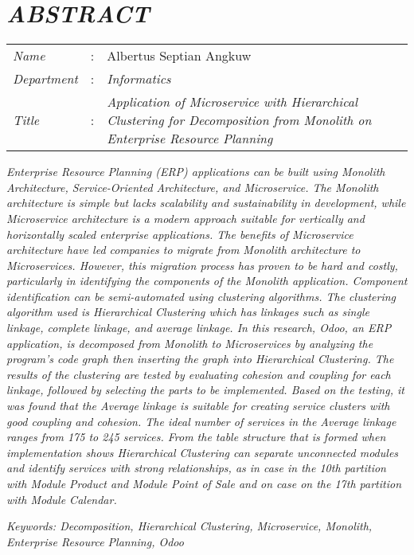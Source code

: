 \chapter*{\textit{ABSTRACT}}

\begin{longtable}{@{}p{2.5cm} l p{10.3cm}}
	\textit{Name} 			& : & Albertus Septian Angkuw \\
	\textit{Department}		& : & \textit{Informatics} \\
	\textit{Title}			& : & \textit{Application of Microservice with Hierarchical Clustering for Decomposition from Monolith on Enterprise Resource Planning} \\
	
	
\end{longtable}


\textit{
	Enterprise Resource Planning (ERP) applications can be built using Monolith Architecture, Service-Oriented Architecture, and Microservice. The Monolith architecture is simple but lacks scalability and sustainability in development, while Microservice architecture is a modern approach suitable for vertically and horizontally scaled enterprise applications. The benefits of Microservice architecture have led companies to migrate from Monolith architecture to Microservices. However, this migration process has proven to be hard and costly, particularly in identifying the components of the Monolith application. Component identification can be semi-automated using clustering algorithms. The clustering algorithm used is Hierarchical Clustering which has linkages such as single linkage, complete linkage, and average linkage. In this research, Odoo, an ERP application, is decomposed from Monolith to Microservices by analyzing the program's code graph then  inserting the graph into Hierarchical Clustering. The results of the clustering are tested by evaluating cohesion and coupling for each linkage, followed by selecting the parts to be implemented. Based on the testing, it was found that the Average linkage is suitable for creating service clusters with good coupling and cohesion. The ideal number of services in the Average linkage ranges from 175 to 245 services. From the table structure that is formed when implementation shows Hierarchical Clustering can separate unconnected modules and identify services with strong relationships, as in case
	in the 10th partition with Module Product and Module Point of Sale and on case
	on the 17th partition with Module Calendar.}


\noindent \textit{Keywords:  Decomposition, Hierarchical Clustering, Microservice, Monolith, Enterprise Resource Planning, Odoo}